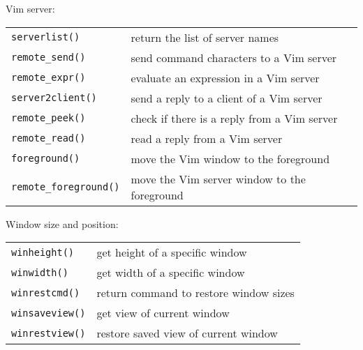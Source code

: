 Vim server:
\label{server-functions}
\begin{center} \begin{tabular}{l l}
				\verb!serverlist()! & return the list of server names \\
				\verb!remote_send()! & send command characters to a Vim server \\
				\verb!remote_expr()! & evaluate an expression in a Vim server \\
				\verb!server2client()! & send a reply to a client of a Vim server \\
				\verb!remote_peek()! & check if there is a reply from a Vim server \\
				\verb!remote_read()! & read a reply from a Vim server \\
				\verb!foreground()! & move the Vim window to the foreground \\
				\verb!remote_foreground()! & move the Vim server window to the foreground \\
\end{tabular} \end{center}

Window size and position:
\label{window-size-functions}
\begin{center} \begin{tabular}{l l}
				\verb!winheight()! & get height of a specific window \\
				\verb!winwidth()! & get width of a specific window \\
				\verb!winrestcmd()! & return command to restore window sizes \\
				\verb!winsaveview()! & get view of current window \\
				\verb!winrestview()! & restore saved view of current window \\
\end{tabular} \end{center}

